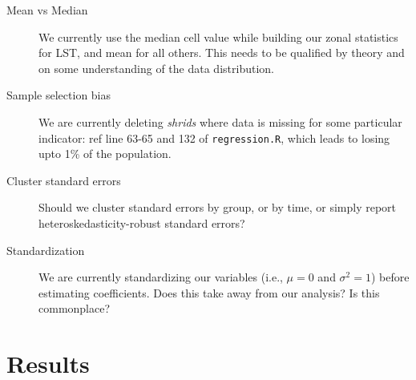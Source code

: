 \documentclass[a4paper,12pt]{article} %
\begin{document}
\begin{description}
    \item[Mean vs Median] We currently use the median cell value while building our zonal statistics for LST, and mean for all others. This needs to be qualified by theory and on some understanding of the data distribution.
    \item[Sample selection bias] We are currently deleting \textit{shrids} where data is missing for some particular indicator: ref line 63-65 and 132 of \texttt{regression.R}, which leads to losing upto 1\% of the population.
    \item[Cluster standard errors] Should we cluster standard errors by group, or by time, or simply report heteroskedasticity-robust standard errors?
    \item[Standardization] We are currently standardizing our variables (i.e., $\mu = 0$ and $\sigma^2 = 1$) before estimating coefficients. Does this take away from our analysis? Is this commonplace?

\end{description}


\section{Results}





\newpage
\end{document}
